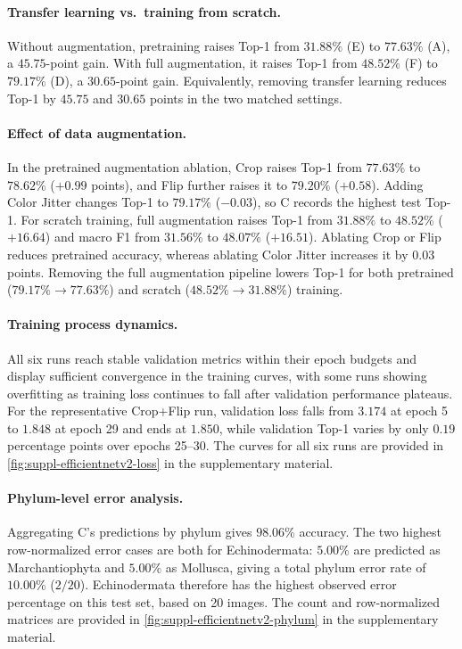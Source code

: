 \paragraph{Transfer learning vs.\ training from scratch.}
Without augmentation, pretraining raises Top-1 from $31.88\%$ (E) to $77.63\%$ (A), a $45.75$-point gain. With full augmentation, it raises Top-1 from $48.52\%$ (F) to $79.17\%$ (D), a $30.65$-point gain. Equivalently, removing transfer learning reduces Top-1 by $45.75$ and $30.65$ points in the two matched settings.

\paragraph{Effect of data augmentation.}
In the pretrained augmentation ablation, Crop raises Top-1 from $77.63\%$ to $78.62\%$ ($+0.99$ points), and Flip further raises it to $79.20\%$ ($+0.58$). Adding Color Jitter changes Top-1 to $79.17\%$ ($-0.03$), so C records the highest test Top-1. For scratch training, full augmentation raises Top-1 from $31.88\%$ to $48.52\%$ ($+16.64$) and macro F1 from $31.56\%$ to $48.07\%$ ($+16.51$). Ablating Crop or Flip reduces pretrained accuracy, whereas ablating Color Jitter increases it by $0.03$ points. Removing the full augmentation pipeline lowers Top-1 for both pretrained ($79.17\%\to77.63\%$) and scratch ($48.52\%\to31.88\%$) training.

\paragraph{Training process dynamics.}
\label{sec:dl-efficientnetv2-training-dynamics}
All six runs reach stable validation metrics within their epoch budgets and display sufficient convergence in the training curves, with some runs showing overfitting as training loss continues to fall after validation performance plateaus. For the representative Crop+Flip run, validation loss falls from $3.174$ at epoch 5 to $1.848$ at epoch 29 and ends at $1.850$, while validation Top-1 varies by only $0.19$ percentage points over epochs 25--30. The curves for all six runs are provided in \cref{fig:suppl-efficientnetv2-loss} in the supplementary material.

\paragraph{Phylum-level error analysis.}
\label{sec:dl-efficientnetv2-error-analysis}
Aggregating C's predictions by phylum gives $98.06\%$ accuracy. The two highest row-normalized error cases are both for Echinodermata: $5.00\%$ are predicted as Marchantiophyta and $5.00\%$ as Mollusca, giving a total phylum error rate of $10.00\%$ ($2/20$). Echinodermata therefore has the highest observed error percentage on this test set, based on 20 images. The count and row-normalized matrices are provided in \cref{fig:suppl-efficientnetv2-phylum} in the supplementary material.

